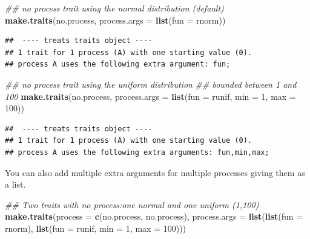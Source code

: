 \documentclass[
]{book}
\newenvironment{Shaded}{\begin{snugshade}}{\end{snugshade}}
\newcommand{\CommentTok}[1]{\textcolor[rgb]{0.56,0.35,0.01}{\textit{#1}}}
\newcommand{\DataTypeTok}[1]{\textcolor[rgb]{0.13,0.29,0.53}{#1}}
\newcommand{\DecValTok}[1]{\textcolor[rgb]{0.00,0.00,0.81}{#1}}
\newcommand{\KeywordTok}[1]{\textcolor[rgb]{0.13,0.29,0.53}{\textbf{#1}}}
\newcommand{\NormalTok}[1]{#1}
\begin{document}
\begin{Shaded}
\begin{Highlighting}[]
\CommentTok{\#\# no process trait using the normal distribution (default)}
\KeywordTok{make.traits}\NormalTok{(no.process, }\DataTypeTok{process.args =} \KeywordTok{list}\NormalTok{(}\DataTypeTok{fun =}\NormalTok{ rnorm))}
\end{Highlighting}
\end{Shaded}

\begin{verbatim}
##  ---- treats traits object ---- 
## 1 trait for 1 process (A) with one starting value (0).
## process A uses the following extra argument: fun;
\end{verbatim}

\begin{Shaded}
\begin{Highlighting}[]
\CommentTok{\#\# no process trait using the uniform distribution}
\CommentTok{\#\# bounded between 1 and 100}
\KeywordTok{make.traits}\NormalTok{(no.process, }\DataTypeTok{process.args =} \KeywordTok{list}\NormalTok{(}\DataTypeTok{fun =}\NormalTok{ runif, }\DataTypeTok{min =} \DecValTok{1}\NormalTok{, }\DataTypeTok{max =} \DecValTok{100}\NormalTok{))}
\end{Highlighting}
\end{Shaded}

\begin{verbatim}
##  ---- treats traits object ---- 
## 1 trait for 1 process (A) with one starting value (0).
## process A uses the following extra arguments: fun,min,max;
\end{verbatim}

You can also add multiple extra arguments for multiple processes giving them as a list.

\begin{Shaded}
\begin{Highlighting}[]
\CommentTok{\#\# Two traits with no process:one normal and one uniform (1,100)}
\KeywordTok{make.traits}\NormalTok{(}\DataTypeTok{process =} \KeywordTok{c}\NormalTok{(no.process, no.process),}
            \DataTypeTok{process.args =} \KeywordTok{list}\NormalTok{(}\KeywordTok{list}\NormalTok{(}\DataTypeTok{fun =}\NormalTok{ rnorm),}
                                \KeywordTok{list}\NormalTok{(}\DataTypeTok{fun =}\NormalTok{ runif, }\DataTypeTok{min =} \DecValTok{1}\NormalTok{, }\DataTypeTok{max =} \DecValTok{100}\NormalTok{)))}
\end{Highlighting}
\end{Shaded}
\end{document}
